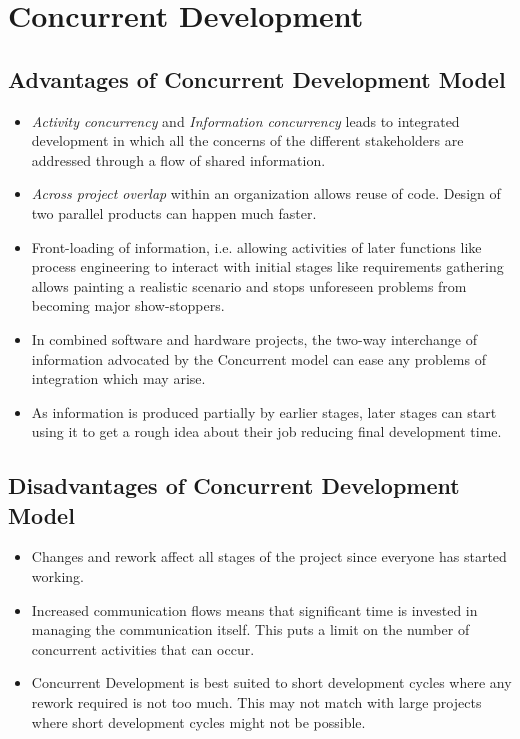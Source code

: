 \documentclass{article}
\begin{document}
\newpage{}
\section{Concurrent Development}
\subsection{Advantages of Concurrent Development Model}
\begin{itemize}
\item \emph{Activity concurrency} and \emph{Information concurrency} leads to integrated development in which all the concerns
of the different stakeholders are addressed through a flow of shared information.
\item \emph{Across project overlap} within an organization allows reuse of code. Design of two parallel products can happen much
faster.
\item Front-loading of information, i.e. allowing activities of later functions like process engineering to interact with initial
stages like requirements gathering allows painting a realistic scenario and stops unforeseen problems from becoming major show-stoppers.
\item In combined software and hardware projects, the two-way interchange of information advocated by the Concurrent model can
ease any problems of integration which may arise.
\item As information is produced partially by earlier stages, later stages can start using it to get a rough idea about their job reducing final development time.
\end{itemize}

\subsection{Disadvantages of Concurrent Development Model}
\begin{itemize}
\item Changes and rework affect all stages of the project since everyone has started working.
\item Increased communication flows means that significant time is invested in managing the communication itself. This puts a limit
on the number of concurrent activities that can occur.
\item Concurrent Development is best suited to short development cycles where any rework required is not too much. This may not match
with large projects where short development cycles might not be possible.
\end{itemize}
\end{document}
